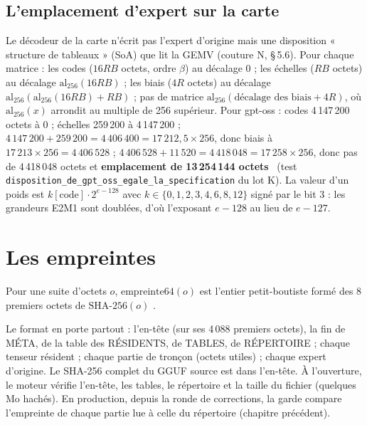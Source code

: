 \subsection{L'emplacement d'expert sur la carte}\label{t2fmt:sec:emplacement}

Le décodeur de la carte n'écrit pas l'expert d'origine mais une disposition « structure de tableaux » (SoA) que lit la GEMV (couture N,  §\,5.6). Pour chaque matrice : les codes ($16RB$ octets, ordre $\beta$) au décalage 0 ; les échelles ($RB$ octets) au décalage $\mathrm{al}_{256}(16RB)$ ; les biais ($4R$ octets) au décalage $\mathrm{al}_{256}(\mathrm{al}_{256}(16RB) + RB)$ ; pas de matrice $\mathrm{al}_{256}(\text{décalage des biais} + 4R)$, où $\mathrm{al}_{256}(x)$ arrondit au multiple de 256 supérieur. Pour gpt-oss : codes 4\,147\,200 octets à 0 ; échelles 259\,200 à 4\,147\,200 ; $4\,147\,200 + 259\,200 = 4\,406\,400 = 17\,212{,}5 \times 256$, donc biais à $17\,213 \times 256 = 4\,406\,528$ ; $4\,406\,528 + 11\,520 = 4\,418\,048 = 17\,258 \times 256$, donc pas de 4\,418\,048 octets et \textbf{emplacement de 13\,254\,144 octets} \calc~(test \nolinkurl{disposition_de_gpt_oss_egale_la_specification} du lot K). La valeur d'un poids est $k[\text{code}] \cdot 2^{e - 128}$ avec $k \in \{0, 1, 2, 3, 4, 6, 8, 12\}$ signé par le bit 3 : les grandeurs E2M1 sont doublées, d'où l'exposant $e - 128$ au lieu de $e - 127$.

\section{Les empreintes}\label{t2fmt:sec:empreintes}

\begin{definition}[Empreinte64]
Pour une suite d'octets $o$, $\mathrm{empreinte64}(o)$ est l'entier petit-boutiste formé des 8 premiers octets de $\mathrm{SHA\text{-}256}(o)$ \cite{fips180_4}.
\end{definition}

Le format en porte partout : l'en-tête (sur ses 4\,088 premiers octets), la fin de MÉTA, de la table des RÉSIDENTS, de TABLES, de RÉPERTOIRE ; chaque tenseur résident ; chaque partie de tronçon (octets utiles) ; chaque expert d'origine. Le SHA-256 complet du GGUF source est dans l'en-tête. À l'ouverture, le moteur vérifie l'en-tête, les tables, le répertoire et la taille du fichier (quelques Mo hachés). En production, depuis la ronde de corrections, la garde compare l'empreinte de chaque partie lue à celle du répertoire (chapitre précédent).

